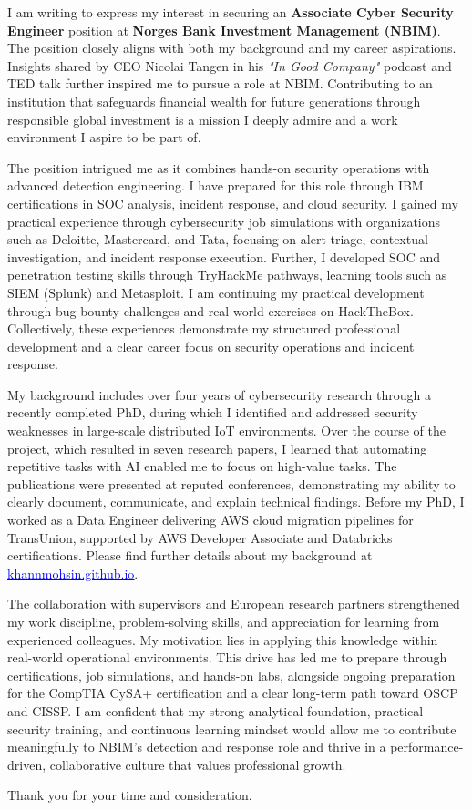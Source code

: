 

I am writing to express my interest in securing an 
\textbf{Associate Cyber Security Engineer} 
position at 
\textbf{Norges Bank Investment Management (NBIM)}. 
The position closely aligns with both my background and my career aspirations.
%
Insights shared by CEO Nicolai Tangen in his \textit{"In Good Company"} podcast and TED talk further inspired me to pursue a role at NBIM. Contributing to an institution that safeguards financial wealth for future generations through responsible global investment is a mission I deeply admire and a work environment I aspire to be part of.

The position intrigued me as it combines hands-on security operations with advanced detection engineering. 
I have prepared for this role through IBM certifications in SOC analysis, incident response, and cloud security.
I gained my practical experience through cybersecurity job simulations with organizations such as Deloitte, Mastercard, and Tata, focusing on alert triage, contextual investigation, and incident response execution.
Further, I developed SOC and penetration testing skills through TryHackMe pathways, learning tools such as SIEM (Splunk) and Metasploit.
I am continuing my practical development through bug bounty challenges and real-world exercises on HackTheBox.
Collectively, these experiences demonstrate my structured professional development and a clear career focus on security operations and incident response.


My background includes over four years of cybersecurity research through a recently completed PhD, during which I identified and addressed security weaknesses in large-scale distributed IoT environments.
%
Over the course of the project, which resulted in seven research papers, I learned that automating repetitive tasks with AI enabled me to focus on high-value tasks.
The publications were presented at reputed conferences, demonstrating my ability to clearly document, communicate, and explain technical findings.
Before my PhD, I worked as a Data Engineer delivering AWS cloud migration pipelines for TransUnion, supported by AWS Developer Associate and Databricks certifications. Please find further details about my background at 
\href{https://khannmohsin.github.io/}{\textcolor{blue}{\underline{khannmohsin.github.io}}}.

The collaboration with supervisors and European research partners strengthened my work discipline, problem-solving skills, and appreciation for learning from experienced colleagues. My motivation lies in applying this knowledge within real-world operational environments. This drive has led me to prepare through certifications, job simulations, and hands-on labs, alongside ongoing preparation for the CompTIA CySA+ certification and a clear long-term path toward OSCP and CISSP. I am confident that my strong analytical foundation, practical security training, and continuous learning mindset would allow me to contribute meaningfully to NBIM’s detection and response role and thrive in a performance-driven, collaborative culture that values professional growth.

Thank you for your time and consideration. 
